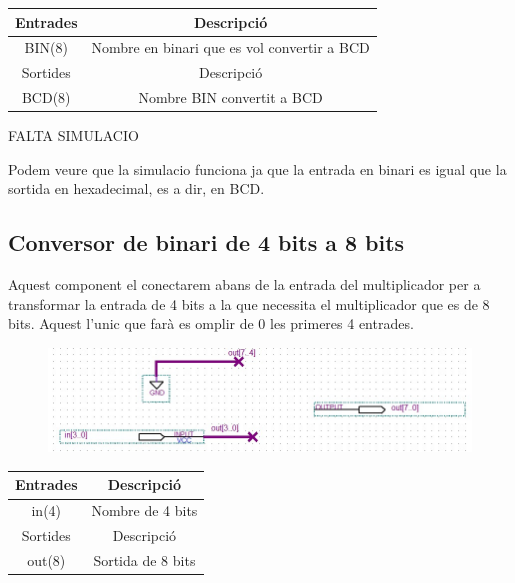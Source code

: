 \documentclass[12pt, a4papre]{article}
\begin{document}
	\begin{table}[h!]
		\centering
		 \begin{tabular}{|c | c|} 
			 \hline
			 Entrades & Descripció\\ [0.5ex] 
			 \hline
			 BIN(8) &  Nombre en binari que es vol convertir a BCD\\ 
			 \hline\hline
			 Sortides & Descripció\\ [0.5ex] 
			 \hline
			 BCD(8) & Nombre BIN convertit a BCD\\ 
			 \hline
		 \end{tabular}
	\end{table}
	
	FALTA SIMULACIO
	
	Podem veure que la simulacio funciona ja que la entrada en binari es igual que la sortida en hexadecimal, es a dir, en BCD.
	
	\subsection{Conversor de binari de 4 bits a 8 bits}
	
	Aquest component el conectarem abans de la entrada del multiplicador per a transformar la entrada de 4 bits a la que necessita el multiplicador que es de 8 bits. Aquest l'unic que farà es omplir de 0 les primeres 4 entrades.
	\begin{figure}[H]
		\begin{center}
		\includegraphics[width=130mm]{Bin_4_8.jpeg}
		\end{center}
	\end{figure}
	
	\begin{table}[h!]
		\centering
		 \begin{tabular}{|c | c|} 
			 \hline
			 Entrades & Descripció\\ [0.5ex] 
			 \hline
			 in(4) &  Nombre de 4 bits\\ 
			 \hline\hline
			 Sortides & Descripció\\ [0.5ex] 
			 \hline
			 out(8) & Sortida de 8 bits\\ 
			 \hline
		 \end{tabular}
	\end{table}
	
\end{document}

